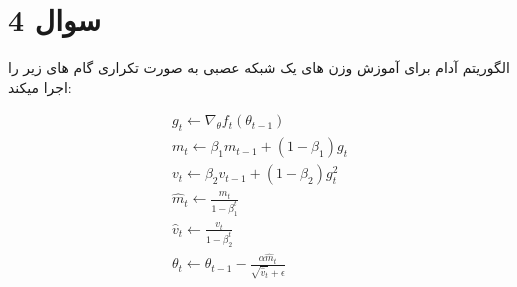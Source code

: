 \section{سوال 4}

الگوریتم آدام برای آموزش وزن های یک شبکه عصبی به صورت تکراری گام های زیر را اجرا میکند:

\begin{gather*}
	g_t \leftarrow  \nabla_\theta f_t(\theta_{t-1})\\
	m_t \leftarrow \beta_1m_{t-1}+(1-\beta_1)g_t\\
	v_t \leftarrow \beta_2v_{t-1}+(1-\beta_2)g_t^2\\
	\hat{m}_t \leftarrow \frac{m_t}{1-\beta_1^t}\\
	\hat{v}_t \leftarrow \frac{v_t}{1-\beta_2^t}\\
	\theta_t\leftarrow \theta_{t-1}-\frac{\alpha\hat{m}_t}{\sqrt{\hat{v}_t}+\epsilon}
\end{gather*}

